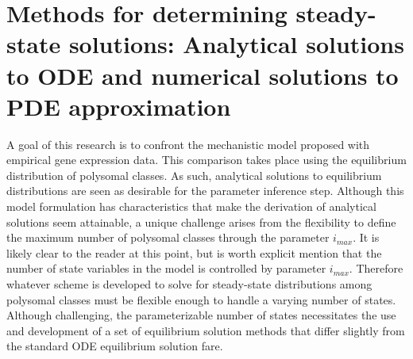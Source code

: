 \documentclass[review]{elsarticle}
\begin{document}


\section{Methods for determining steady-state solutions: Analytical solutions to ODE and numerical solutions to PDE approximation}
A goal of this research is to confront the mechanistic model proposed with empirical gene expression data.
This comparison takes place using the equilibrium distribution of polysomal classes.
As such, analytical solutions to equilibrium distributions are seen as desirable for the parameter inference step.
Although this model formulation has characteristics that make the derivation of analytical solutions seem attainable, a unique challenge arises from the flexibility to define the maximum number of polysomal classes through the parameter $i_{max}$.
It is likely clear to the reader at this point, but is worth explicit mention that the number of state variables in the model is controlled by parameter $i_{max}$.
Therefore whatever scheme is developed to solve for steady-state distributions among polysomal classes must be flexible enough to handle a varying number of states.
Although challenging, the parameterizable number of states necessitates the use and development of a set of equilibrium solution methods that differ slightly from the standard ODE equilibrium solution fare.

\end{document}

